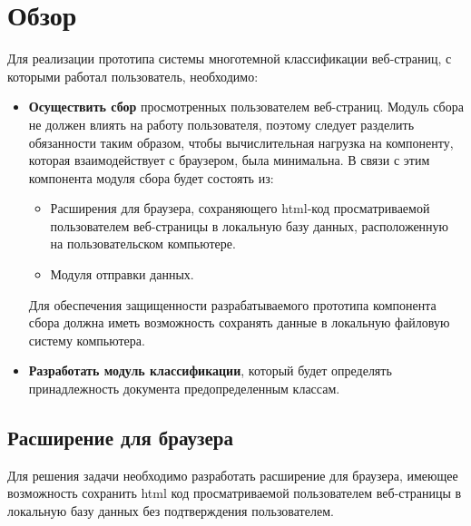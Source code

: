 \documentclass[russian, utf8, emptystyle]{eskdtext}
\begin{document}
\section{Обзор}
Для реализации прототипа системы многотемной классификации веб-страниц, с которыми работал пользователь, необходимо:
\begin{itemize}
	\item {\bf Осуществить сбор} просмотренных пользователем веб-страниц. Модуль сбора не должен влиять на работу пользователя, поэтому следует разделить обязанности таким образом, чтобы вычислительная нагрузка на компоненту, которая взаимодействует с браузером, была минимальна. В связи с этим компонента модуля сбора будет состоять из:
	\begin{itemize}
		\item Расширения для браузера, сохраняющего html-код просматриваемой пользователем веб-страницы в локальную базу данных, расположенную на пользовательском компьютере.
		\item Модуля отправки данных.
	\end{itemize}
	Для обеспечения защищенности разрабатываемого прототипа компонента сбора должна иметь возможность сохранять данные в локальную файловую систему компьютера.
	\item {\bf Разработать модуль классификации}, который будет определять принадлежность документа предопределенным классам.
\end{itemize}


\subsection{Расширение для браузера}
Для решения задачи необходимо разработать расширение для браузера, имеющее возможность сохранить html код просматриваемой пользователем веб-страницы в локальную базу данных без подтверждения пользователем.
\end{document}
